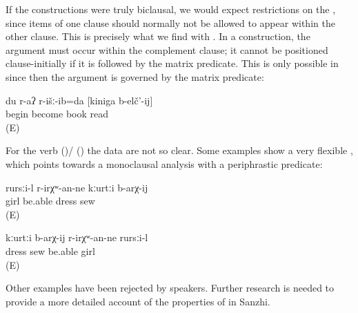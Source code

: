 If the constructions were truly biclausal, we would expect restrictions on the , since items of one clause should normally not be allowed to appear within the other clause. This is precisely what we find with . In a  construction, the  argument must occur within the complement clause; it cannot be positioned clause-initially if it is followed by the matrix predicate. This is only possible in  since then the argument is governed by the matrix predicate:
%
\begin{exe}
	\ex	\label{ex:‎I began to read the book}
	\gll	du	r-aʔ	r-išː-ib=da	[kiniga	b-elč'-ij]\\
			\tsc{f-}begin	become	book	read\\
	\glt	{} (E)

\end{exe}

For the verb   ()\slash{} ()  the data are not so clear. Some examples show a very flexible , which points towards a monoclausal analysis with a periphrastic predicate:
%
\begin{exe}
	\ex
	\gll	rursːi-l	r-irχʷ-an-ne kːurtːi	b-arχ-ij \\
		girl	be.able	dress	sew\\
	\glt	{} (E)

	\ex
	\gll	kːurtːi	b-arχ-ij	r-irχʷ-an-ne	rursːi-l\\
		dress	sew	be.able	girl\\
	\glt	{} (E)
\end{exe}

Other examples have been rejected by speakers. Further research is needed to provide a more detailed account of the properties of  in Sanzhi.




